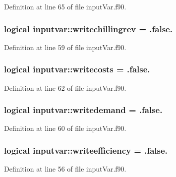 Definition at line 65 of file input\-Var.\-f90.

\hypertarget{classinputvar_a2d475a99a1a0efcca534104cf8e2efb5}{
\subsubsection[{writechillingrev}]{\setlength{\rightskip}{0pt plus 5cm}logical inputvar\-::writechillingrev = .false.}}\label{classinputvar_a2d475a99a1a0efcca534104cf8e2efb5}


Definition at line 59 of file input\-Var.\-f90.

\hypertarget{classinputvar_a5fa854d48ca73d10b807273f373076b2}{
\subsubsection[{writecosts}]{\setlength{\rightskip}{0pt plus 5cm}logical inputvar\-::writecosts = .false.}}\label{classinputvar_a5fa854d48ca73d10b807273f373076b2}


Definition at line 62 of file input\-Var.\-f90.

\hypertarget{classinputvar_ad6cafaf46b6d0f5bfaeb1ca26ccd0c68}{
\subsubsection[{writedemand}]{\setlength{\rightskip}{0pt plus 5cm}logical inputvar\-::writedemand = .false.}}\label{classinputvar_ad6cafaf46b6d0f5bfaeb1ca26ccd0c68}


Definition at line 60 of file input\-Var.\-f90.

\hypertarget{classinputvar_a7d67f2fa2027e1d60264f442eef9759c}{
\subsubsection[{writeefficiency}]{\setlength{\rightskip}{0pt plus 5cm}logical inputvar\-::writeefficiency = .false.}}\label{classinputvar_a7d67f2fa2027e1d60264f442eef9759c}


Definition at line 56 of file input\-Var.\-f90.

